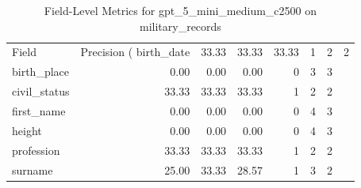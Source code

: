 \begin{table}
\caption{Field-Level Metrics for gpt_5_mini_medium_c2500 on military_records}
\label{tab:fields_gpt_5_mini_medium_c2500_military_records}
\begin{tabular}{lrrrrrr}
\toprule
Field & Precision (%
\midrule
birth_date & 33.33 & 33.33 & 33.33 & 1 & 2 & 2 \\
birth_place & 0.00 & 0.00 & 0.00 & 0 & 3 & 3 \\
civil_status & 33.33 & 33.33 & 33.33 & 1 & 2 & 2 \\
first_name & 0.00 & 0.00 & 0.00 & 0 & 4 & 3 \\
height & 0.00 & 0.00 & 0.00 & 0 & 4 & 3 \\
profession & 33.33 & 33.33 & 33.33 & 1 & 2 & 2 \\
surname & 25.00 & 33.33 & 28.57 & 1 & 3 & 2 \\
\bottomrule
\end{tabular}
\end{table}
